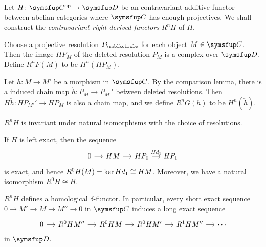 \begin{definition}
  Let $H\colon \CAT{C}^{\OP}\to \CAT{D}$ be an contravariant additive functor between abelian categories where $\CAT{C}$ has enough projectives. We shall construct the \emph{contravariant right derived functors} $R^nH$ of $H$.

  Choose a projective resolution $P_\CCCIR$ for each object $M\in\CAT{C}$. Then the image $HP_M$ of the deleted resolution $P_M$ is a complex over $\CAT{D}$. Define $R^nF(M)$ to be $H^n(HP_M)$.

  Let $h\colon M\to M'$ be a morphism in $\CAT{C}$. By the comparison lemma, there is a induced chain map $\check h\colon P_M\to P_{M'}'$ between deleted resolutions. Then $H\check h\colon HP_{M'}'\to HP_{M}$ is also a chain map, and we define $R^nG(h)$ to be $H^n(\check h)$.
\end{definition}

\begin{remark}
  $R^nH$ is invariant under natural isomorphisms with the choice of resolutions.
\end{remark}

\begin{remark}
  If $H$ is left exact, then the sequence
  \begin{equation*}
    \begin{tikzcd}[sep=small]
      0 & HM & HP_0 & HP_1
      \arrow[from=1-1,]{1-2}[]{}
      \arrow[from=1-2,]{1-3}[]{}
      \arrow[from=1-3,]{1-4}[]{Hd_1}
    \end{tikzcd}
  \end{equation*}
  is exact, and hence $R^0H(M)=\operatorname{ker} Hd_1 \cong HM$. Moreover, we have a natural isomorphism $R^0H\cong H$.
\end{remark}

\begin{proposition}
  $R^nH$ defines a homological $\delta$-functor. In particular, every short exact sequence $0\to M'\to M\to M''\to 0$ in $\CAT{C}$ induces a long exact sequence
  \begin{equation*}
    \begin{tikzcd}[sep=small]
      0 & R^0HM'' & R^0HM & R^0HM' & R^1HM'' & \dotsb
      \arrow[from=1-1,]{1-2}[]{}
      \arrow[from=1-2,]{1-3}[]{}
      \arrow[from=1-3,]{1-4}[]{}
      \arrow[from=1-4,]{1-5}[]{}
      \arrow[from=1-5,]{1-6}[]{}
    \end{tikzcd}
  \end{equation*}
  in $\CAT{D}$.
\end{proposition}

